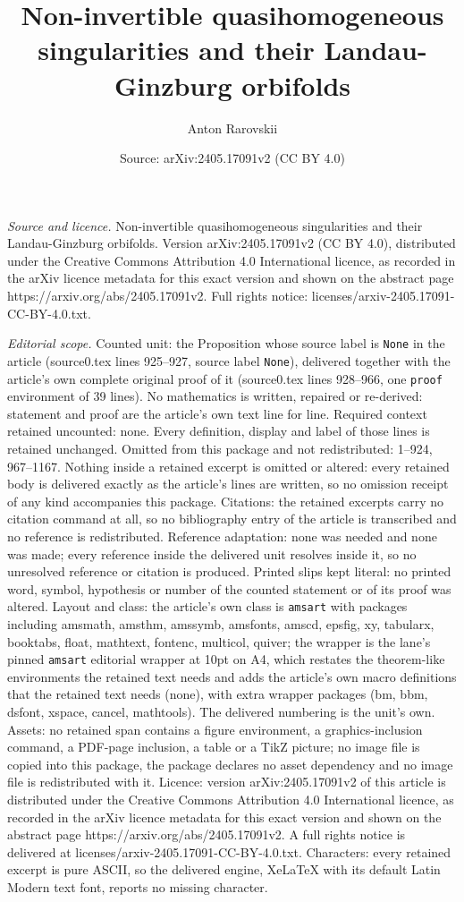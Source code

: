 \documentclass[10pt,a4paper]{amsart}
\title[Non-invertible quasihomogeneous singularities and their Land]{Non-invertible quasihomogeneous singularities and their Landau-Ginzburg orbifolds}
\author{Anton Rarovskii}
\date{Source: arXiv:2405.17091v2 (CC BY 4.0)}
\begin{document}
\maketitle

\noindent\emph{Source and licence.} Non-invertible quasihomogeneous singularities and their Landau-Ginzburg orbifolds. Version arXiv:2405.17091v2 (CC BY 4.0), distributed under the Creative Commons Attribution 4.0 International licence, as recorded in the arXiv licence metadata for this exact version and shown on the abstract page https://arxiv.org/abs/2405.17091v2. Full rights notice: licenses/arxiv-2405.17091-CC-BY-4.0.txt.\par\smallskip

\noindent\textit{Editorial scope.} Counted unit: the Proposition whose source label is \texttt{None} in the article (source0.tex lines 925--927, source label \texttt{None}), delivered together with the article's own complete original proof of it (source0.tex lines 928--966, one \texttt{proof} environment of 39 lines). No mathematics is written, repaired or re-derived: statement and proof are the article's own text line for line. Required context retained uncounted: none. Every definition, display and label of those lines is retained unchanged. Omitted from this package and not redistributed: 1--924, 967--1167. Nothing inside a retained excerpt is omitted or altered: every retained body is delivered exactly as the article's lines are written, so no omission receipt of any kind accompanies this package. Citations: the retained excerpts carry no citation command at all, so no bibliography entry of the article is transcribed and no reference is redistributed. Reference adaptation: none was needed and none was made; every reference inside the delivered unit resolves inside it, so no unresolved reference or citation is produced. Printed slips kept literal: no printed word, symbol, hypothesis or number of the counted statement or of its proof was altered. Layout and class: the article's own class is \texttt{amsart} with packages including amsmath, amsthm, amssymb, amsfonts, amscd, epsfig, xy, tabularx, booktabs, float, mathtext, fontenc, multicol, quiver; the wrapper is the lane's pinned \texttt{amsart} editorial wrapper at 10pt on A4, which restates the theorem-like environments the retained text needs and adds the article's own macro definitions that the retained text needs (none), with extra wrapper packages (bm, bbm, dsfont, xspace, cancel, mathtools). The delivered numbering is the unit's own. Assets: no retained span contains a figure environment, a graphics-inclusion command, a PDF-page inclusion, a table or a TikZ picture; no image file is copied into this package, the package declares no asset dependency and no image file is redistributed with it. Licence: version arXiv:2405.17091v2 of this article is distributed under the Creative Commons Attribution 4.0 International licence, as recorded in the arXiv licence metadata for this exact version and shown on the abstract page https://arxiv.org/abs/2405.17091v2. A full rights notice is delivered at licenses/arxiv-2405.17091-CC-BY-4.0.txt. Characters: every retained excerpt is pure ASCII, so the delivered engine, XeLaTeX with its default Latin Modern text font, reports no missing character.
\end{document}
